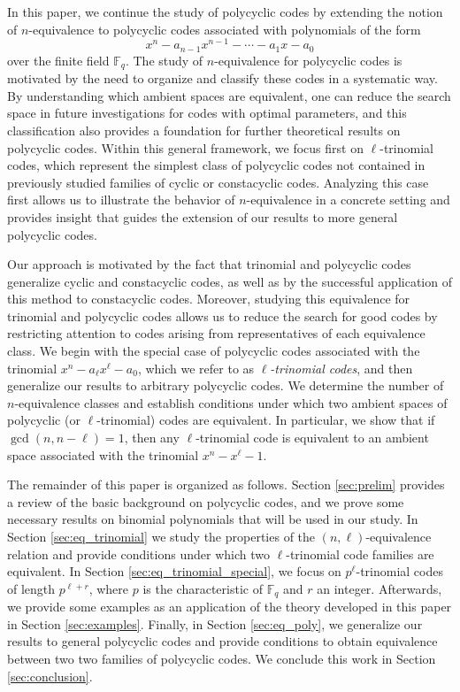 \documentclass[12pt]{elsarticle}
\newcommand{\Fq}{\mathbb{F}_{q}}
\theoremstyle{break}
{\theorembodyfont{\upshape}
    \newtheorem{theorem}{Theorem}[section] %
    \newtheorem{lemma}[theorem]{Lemma} %
    \newtheorem{proposition}[theorem]{Proposition}
    \newtheorem{corollary}[theorem]{Corollary}
    \newtheorem{definition}[theorem]{Definition}
    \newtheorem{example}[theorem]{Example}
    \newtheorem{remark}[theorem]{Remark}
    \newtheorem{conjecture}[theorem]{Conjecture}
    \newtheorem*{proof}{{Proof}}
	\newtheorem*{notation}{Notation}
	\newtheorem*{main}{Cain Theorem}
	\newtheorem*{problem}{Problem}
}
\begin{document}
In this paper, we continue the study of polycyclic codes by extending the notion of $n$-equivalence to polycyclic codes associated with polynomials of the form
\[
x^n - a_{n-1}x^{n-1} - \cdots - a_1x - a_0
\]
over the finite field $\mathbb{F}_q$. 
The study of $n$-equivalence for polycyclic codes is motivated by the need to organize and classify these codes in a systematic way. By understanding which ambient spaces are equivalent, one can reduce the search space in future investigations for codes with optimal parameters, and this classification also provides a foundation for further theoretical results on polycyclic codes. 
Within this general framework, we focus first on $\ell$-trinomial codes, which represent the simplest class of polycyclic codes not contained in previously studied families of cyclic or constacyclic codes. Analyzing this case first allows us to illustrate the behavior of $n$-equivalence in a concrete setting and provides insight that guides the extension of our results to more general polycyclic codes.

Our approach is motivated by the fact that trinomial and polycyclic codes generalize cyclic and constacyclic codes, as well as by the successful application of this method to constacyclic codes. Moreover, studying this equivalence for trinomial and polycyclic codes allows us to reduce the search for good codes by restricting attention to codes arising from representatives of each equivalence class. 
We begin with the special case of polycyclic codes associated with the trinomial $x^n - a_{\ell}x^{\ell} - a_0$, which we refer to as \textit{$\ell$-trinomial codes}, and then generalize our results to arbitrary polycyclic codes. We determine the number of $n$-equivalence classes and establish conditions under which two ambient spaces of polycyclic (or $\ell$-trinomial) codes are equivalent. In particular, we show that if $\gcd(n,n-\ell)=1$, then any $\ell$-trinomial code is equivalent to an ambient space associated with the trinomial $x^n - x^{\ell} - 1$.

The remainder of this paper is organized as follows. Section \ref{sec:prelim} provides a review of the basic background on polycyclic codes, and  we prove some necessary results on binomial polynomials that will be used in our study.  In Section \ref{sec:eq_trinomial} we study the properties of the  $(n,\ell)$-equivalence relation and provide conditions under which two $\ell$-trinomial   code families are equivalent. 
In  Section \ref{sec:eq_trinomial_special},  we focus on $p^{\ell}$-trinomial codes of length $p^{\ell+r}$, where $p$ is the characteristic of $\Fq$ and $r$ an integer. Afterwards, we provide some examples as an application of the theory developed in this paper in Section \ref{sec:examples}.
Finally, in Section \ref{sec:eq_poly}, we  generalize our results to general polycyclic codes and provide  conditions to obtain equivalence between two two families of polycyclic codes. 
We conclude this work in Section \ref{sec:conclusion}.
\end{document}
